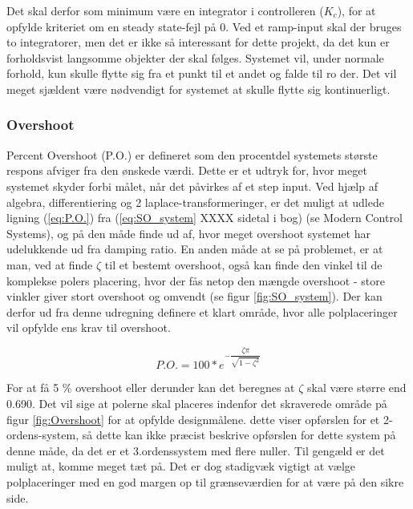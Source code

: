 Det skal derfor som minimum være en integrator i controlleren ($K_{c}$), for at opfylde kriteriet om en steady state-fejl på 0. Ved et ramp-input skal der bruges to integratorer, men det er ikke så interessant for dette projekt, da det kun er forholdsvist langsomme objekter der skal følges. Systemet vil, under normale forhold, kun skulle flytte sig fra et punkt til et andet og falde til ro der. Det vil meget sjældent være nødvendigt for systemet at skulle flytte sig kontinuerligt.

\subsubsection{Overshoot}

Percent Overshoot (P.O.) er defineret som den procentdel systemets største respons afviger fra den ønskede værdi. Dette er et udtryk for, hvor meget systemet skyder forbi målet, når det påvirkes af et step input. Ved hjælp af algebra, differentiering og 2 laplace-transformeringer, er det muligt at udlede ligning (\ref{eq:P.O.}) fra (\ref{eq:SO_system} XXXX sidetal i bog) (se Modern Control Systems\cite{ModernControlSystem}), og på den måde finde ud af, hvor meget overshoot systemet har udelukkende ud fra damping ratio. En anden måde at se på problemet, er at man, ved at finde $\zeta$ til et bestemt overshoot, også kan finde den vinkel til de komplekse polers placering, hvor der fås netop den mængde overshoot - store vinkler giver stort overshoot og omvendt (se figur \ref{fig:SO_system}). Der kan derfor ud fra denne udregning definere et klart område, hvor alle polplaceringer vil opfylde ens krav til overshoot. 

\begin{equation}\label{eq:P.O.}
P.O.=100*e^{-\dfrac{\zeta\pi}{\sqrt{1-\zeta^2}}}
\end{equation}

For at få 5 $\%$ overshoot eller derunder kan det beregnes at $\zeta$ skal være større end 0.690. Det vil sige at polerne skal placeres indenfor det skraverede område på figur \ref{fig:Overshoot} for at opfylde designmålene. dette viser opførslen for et 2-ordens-system, så dette kan ikke præcist beskrive opførslen for dette system på denne måde, da det er et 3.ordenssystem med flere nuller. Til gengæld er det muligt at, komme meget tæt på. Det er dog stadigvæk vigtigt at vælge polplaceringer med en god margen op til grænseværdien for at være på den sikre side.

